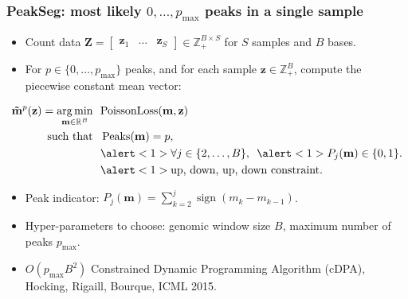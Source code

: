 \documentclass{beamer}
\DeclareMathOperator*{\argmin}{arg\,min}
\DeclareMathOperator*{\Peaks}{Peaks}
\newcommand{\sign}{\operatorname{sign}}
\newcommand{\RR}{\mathbb R}
\newcommand{\ZZ}{\mathbb Z}
\begin{document}
\begin{frame}
  \frametitle{PeakSeg: most likely $0, \dots, p_{\text{max}}$ peaks in
    a single sample}

  \begin{itemize}
    \item Count data $\mathbf Z = \left[
    \begin{array}{ccc}
      \mathbf z_1 & \dots & \mathbf z_S
    \end{array}
    \right]\in\ZZ_+^{B\times S}$ for $S$ samples and $B$ bases.
  \item For $p\in\{0, \dots, p_{\text{max}}\}$ peaks, and for each
    sample $\mathbf z\in\ZZ_+^B$, compute the piecewise constant mean
    vector:
  \end{itemize}
  \begin{align*}
    \mathbf{\tilde m}^p(\mathbf z)  =
    \argmin_{\mathbf m\in\RR^{B}} &\ \ 
    \text{PoissonLoss}(\mathbf m, \mathbf z) 
    \\
    \text{such that} &\ \ 
    \Peaks(\mathbf m)=p,  \\
    &\ \  \alert<1>{\forall j\in\{2, \dots, B\},} 
    \ \ \alert<1>{P_j(\mathbf m) \in\{0, 1\}.}\\
    &\ \  \alert<1>{\text{up, down, up, down constraint.}}\\
  \end{align*}
  \vskip -1cm
  \begin{itemize}
  \item Peak indicator: $P_j(\mathbf m) = \sum_{k=2}^j \sign( m_{k} - m_{k-1} )$.
  \item Hyper-parameters to choose: genomic window size $B$, maximum
    number of peaks $p_{\text{max}}$.
  \item $O(p_{\text{max}} B^2)$ Constrained Dynamic Programming
    Algorithm (cDPA), Hocking, Rigaill, Bourque, ICML 2015.
  \end{itemize}
\end{frame}


\end{document}

